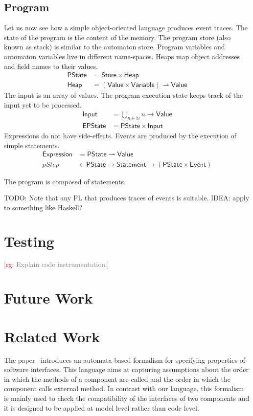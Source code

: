 \documentclass[preprint]{sigplanconf} %
\newcommand{\note}[2]{\textcolor{gray}{[\textcolor{red}{#1}: #2]}}
\newcommand{\rg}[1]{\note{rg}{#1}}
\newcommand{\N}{\ensuremath{\mathbb{N}}}
\newcommand{\pmap}{\rightharpoonup}
\newcommand{\set}[1]{\ensuremath{\mathsf{#1}}}
\theoremstyle{definition}
\begin{document}
\subsection{Program} %

Let us now see how a simple object-oriented language produces event traces.
The state of the program is the content of the memory.
The program store (also known as stack) is similar to the automaton store.
Program variables and automaton variables live in different name-spaces.
Heaps map object addresses and field names to their values.
\begin{align}
\set{PState}&=\set{Store}\times\set{Heap}\\
\set{Heap}&=(\set{Value}\times\set{Variable})\pmap\set{Value}
\end{align}
The input is an array of values.
The program execution state keeps track of the input yet to be processed.
\begin{align}
\set{Input}&=\bigcup_{n\in\N}n\to\set{Value}\\
\set{EPState}&=\set{PState}\times\set{Input}
\end{align}
Expressions do not have side-effects.
Events are produced by the execution of simple statements.
\begin{align}
\set{Expression}&=\set{PState}\pmap\set{Value} \\
\mathit{pStep}&\in\set{PState}\to\set{Statement}\to(\set{PState}\times\set{Event})
\end{align}


The program is composed of statements.



TODO: Note that any PL that produces traces of events is suitable.
IDEA: apply to something like Haskell?

\section{Testing}\label{sec:testing} %

\rg{Explain code instrumentation.}


\section{Future Work}\label{sec:future} %

\section{Related Work}\label{sec:related} %
The paper~\cite{DBLP:conf/sigsoft/AlfaroH01} introduces an automata-based formalism for specifying properties of software interfaces. 
This language aims at capturing assumptions about the order in which the methods of a component are called and the order in which the component calls external method. 
In contrast with our language, this formalism is mainly used to check the compatibility of the interfaces of two components and it is designed to be applied at  model level rather than code level.
\end{document}
